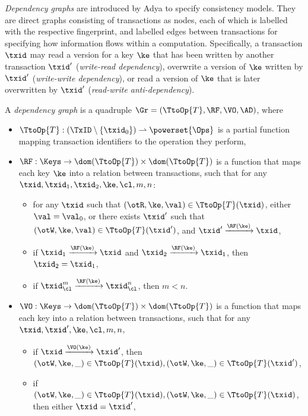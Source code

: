 \emph{Dependency graphs} are introduced by Adya \cite{adya} to specify 
consistency models. They are direct graphs consisting of transactions as nodes, 
each of which is labelled with the respective fingerprint, and labelled edges 
between transactions for specifying how information flows within a computation. 
Specifically, a transaction $\txid$ may read a version for a key $\ke$ that has been written by another transaction $\txid'$ 
(\emph{write-read dependency}), overwrite a version  of $\ke$ written by $\txid'$ (\emph{write-write dependency}), or 
read a version of $\ke$ that is later overwritten by $\txid'$ (\emph{read-write anti-dependency}).
\begin{definition}
A \emph{dependency graph} is a quadruple $\Gr = (\TtoOp{T}, \RF, \VO, \AD)$, where
\begin{itemize}
\item $\TtoOp{T}: (\TxID \setminus \{\txid_0\}) \rightharpoonup \powerset{\Ops}$ is a partial function 
mapping transaction identifiers to the operation they perform, 
\item $\RF : \Keys \rightarrow \dom(\TtoOp{T}) \times \dom(\TtoOp{T})$ is a function that 
maps each key $\ke$ into a relation between transactions, such that for any $\txid, \txid_1, \txid_2, 
\ke, \cl, m, n$: 
\begin{itemize}
\item for any $\txid$ such that $(\otR, \ke, \val) \in \TtoOp{T}(\txid)$, either $\val = \val_0$, 
or there exists $\txid'$ such that $(\otW, \ke, \val) \in \TtoOp{T}(\txid')$, and $\txid' \xrightarrow{\RF(\ke)} \txid$, 
\item if $\txid_1 \xrightarrow{\RF(\ke)} \txid$ and $\txid_2 \xrightarrow{\RF(\ke)} \txid_1$, then 
$\txid_2 = \txid_1$, 
\item if $\txid_{\cl}^{m} \xrightarrow{\RF(\ke)} \txid_{\cl}^{n}$, then $m < n$.
\end{itemize}
\item $\VO: \Keys \rightarrow \dom(\TtoOp{T}) \times \dom(\TtoOp{T})$ is a function 
that maps each key into a relation between transactions, such that for any $\txid, \txid', \ke, \cl, m, n$, 
\begin{itemize}
\item if $\txid \xrightarrow{\VO(\ke)} \txid'$, then $(\otW, \ke, \_) \in \TtoOp{T}(\txid), (\otW, \ke, \_) \in \TtoOp{T}(\txid')$, 
\item if $(\otW, \ke, \_) \in \TtoOp{T}(\txid), (\otW, \ke, \_) \in \TtoOp{T}(\txid)$, then either $\txid = \txid'$, 

\end{itemize}
\end{itemize}
\end{definition}
